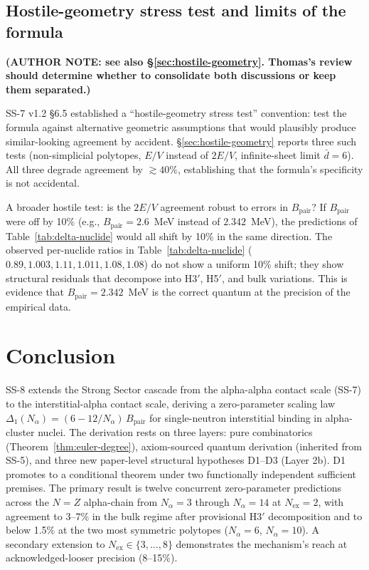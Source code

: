 \documentclass[11pt,letterpaper]{article}
\theoremstyle{definition}
\newcommand{\Bpair}{B_{\text{pair}}}
\newcommand{\Nalpha}{N_\alpha}
\newcommand{\Nex}{N_{\text{ex}}}
\begin{document}
\subsection{Hostile-geometry stress test and limits of the formula}
\label{sec:hostile-geometry-limits}

\textbf{(AUTHOR NOTE: see also \S\ref{sec:hostile-geometry}. Thomas's review should determine whether to consolidate both discussions or keep them separated.)}

SS-7 v1.2 \S6.5 established a ``hostile-geometry stress test'' convention: test the formula against alternative geometric assumptions that would plausibly produce similar-looking agreement by accident. \S\ref{sec:hostile-geometry} reports three such tests (non-simplicial polytopes, $E/V$ instead of $2E/V$, infinite-sheet limit $\bar{d} = 6$). All three degrade agreement by $\gtrsim 40\%$, establishing that the formula's specificity is not accidental.

A broader hostile test: is the $2E/V$ agreement robust to errors in $\Bpair$? If $\Bpair$ were off by 10\% (e.g., $\Bpair = 2.6$~MeV instead of $2.342$~MeV), the predictions of Table~\ref{tab:delta-nuclide} would all shift by 10\% in the same direction. The observed per-nuclide ratios in Table~\ref{tab:delta-nuclide} ($0.89, 1.003, 1.11, 1.011, 1.08, 1.08$) do not show a uniform 10\% shift; they show structural residuals that decompose into H3$'$, H5$'$, and bulk variations. This is evidence that $\Bpair = 2.342$~MeV is the correct quantum at the precision of the empirical data.


\section{Conclusion}
\label{sec:conclusion}

SS-8 extends the Strong Sector cascade from the alpha-alpha contact scale (SS-7) to the interstitial-alpha contact scale, deriving a zero-parameter scaling law $\Delta_1(\Nalpha) = (6 - 12/\Nalpha)\,\Bpair$ for single-neutron interstitial binding in alpha-cluster nuclei. The derivation rests on three layers: pure combinatorics (Theorem~\ref{thm:euler-degree}), axiom-sourced quantum derivation (inherited from SS-5), and three new paper-level structural hypotheses D1--D3 (Layer 2b). D1 promotes to a conditional theorem under two functionally independent sufficient premises. The primary result is twelve concurrent zero-parameter predictions across the $N = Z$ alpha-chain from $\Nalpha = 3$ through $\Nalpha = 14$ at $\Nex = 2$, with agreement to 3--7\% in the bulk regime after provisional H3$'$ decomposition and to below 1.5\% at the two most symmetric polytopes ($\Nalpha = 6$, $\Nalpha = 10$). A secondary extension to $\Nex \in \{3, \ldots, 8\}$ demonstrates the mechanism's reach at acknowledged-looser precision (8--15\%).
\end{document}
